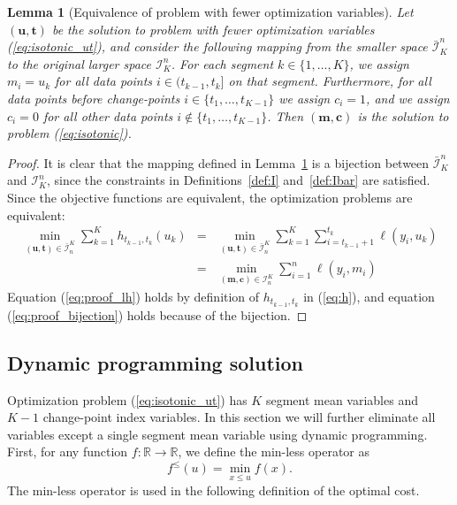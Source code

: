 \documentclass{article}
\newtheorem{lemma}{Lemma}
\newcommand{\RR}{\mathbb R}
\begin{document}
\begin{lemma}[Equivalence of problem with fewer optimization variables]
  \label{lemma:fewer-variables}
  Let $(\mathbf u, \mathbf t)$ be the solution to problem with fewer
  optimization variables (\ref{eq:isotonic_ut}), and consider the
  following mapping from the smaller space $\bar{\mathcal I}_K^n$ to
  the original larger space $\mathcal I_K^n$. For each segment
  $k\in\{1,\dots,K\}$, we assign $m_i = u_k$ for all data points
  $i\in(t_{k-1},t_k]$ on that segment. Furthermore, for all data
  points before change-points $i\in\{t_1,\dots,t_{K-1}\}$ we assign
  $c_i=1$, and we assign $c_i=0$ for all other data points
  $i\not\in\{t_1,\dots,t_{K-1}\}$. Then $(\mathbf m, \mathbf c)$ is
  the solution to problem (\ref{eq:isotonic}).
\end{lemma}

\begin{proof}
  It is clear that the mapping defined in Lemma~\ref{lemma:fewer-variables} is
  a bijection between $\bar{\mathcal I}_K^n$ and $\mathcal I_K^n$,
  since the constraints in Definitions~\ref{def:I} and~\ref{def:Ibar}
  are satisfied. Since the objective functions are equivalent, the
  optimization problems are equivalent:
  \begin{eqnarray}
  \min_{(\mathbf u, \mathbf t)\in\bar{\mathcal I}_n^K}
  \sum_{k=1}^K
  h_{t_{k-1}, t_k}(u_k) 
    &=& \label{eq:proof_lh}
  \min_{(\mathbf u, \mathbf t)\in\bar{\mathcal I}_n^K}
\sum_{k=1}^K 
        \sum_{i=t_{k-1}+1}^{t_k} \ell(y_i, u_k)\\
    &=& \label{eq:proof_bijection}
  \min_{(\mathbf m, \mathbf c)\in\mathcal I_n^K}
        \sum_{i=1}^{n} \ell(y_i, m_i)
  \end{eqnarray}
  Equation (\ref{eq:proof_lh}) holds by definition of
  $h_{t_{k-1},t_k}$ in (\ref{eq:h}), and equation
  (\ref{eq:proof_bijection}) holds because of the bijection.
\end{proof}

\subsection{Dynamic programming solution}

Optimization problem (\ref{eq:isotonic_ut}) has $K$ segment mean
variables and $K-1$ change-point index variables. In this section we
will further eliminate all variables except a single segment mean
variable using dynamic programming. First, for any function
$f:\RR\rightarrow\RR$, we define the min-less operator as
\begin{equation}
  \label{eq:min-less-def}
  f^\leq(u)=\min_{x\leq u} f(x).
\end{equation}
The min-less operator is used in the following definition of the
optimal cost.
\end{document}
